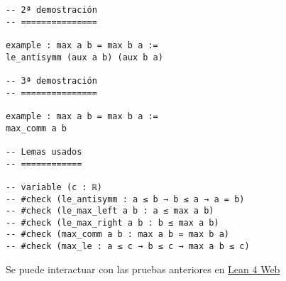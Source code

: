 \begin{verbatim}
-- 2ª demostración
-- ===============

example : max a b = max b a :=
le_antisymm (aux a b) (aux b a)

-- 3ª demostración
-- ===============

example : max a b = max b a :=
max_comm a b

-- Lemas usados
-- ============

-- variable (c : ℝ)
-- #check (le_antisymm : a ≤ b → b ≤ a → a = b)
-- #check (le_max_left a b : a ≤ max a b)
-- #check (le_max_right a b : b ≤ max a b)
-- #check (max_comm a b : max a b = max b a)
-- #check (max_le : a ≤ c → b ≤ c → max a b ≤ c)
\end{verbatim}
Se puede interactuar con las pruebas anteriores en \href{https://lean.math.hhu.de/\#url=https://raw.githubusercontent.com/jaalonso/Calculemus2/main/src/Conmutatividad\_del\_maximo.lean}{Lean 4 Web}

